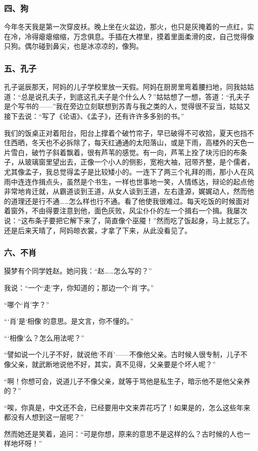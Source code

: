 \subsubsection*{四、狗}
\par 今年冬天我是第一次穿皮袄。晚上坐在火盆边，那火，也只是灰掩着的一点红，实在冷，冷得瘪瘪缩缩，万念俱息。手插在大襟里，摸着里面柔滑的皮，自己觉得像只狗。偶尔碰到鼻尖，也是冰凉凉的，像狗。
\subsubsection*{五、孔子}
\par 孔子诞辰那天，阿妈的儿子学校里放一天假。阿妈在厨房里弯着腰扫地，同我姑姑道：“总是说孔夫子，到底这孔夫子是个什么人？”姑姑想了一想，答道：“孔夫子是个写书的——”我在旁边立刻联想到苏青与我之类的人，觉得很不妥当，姑姑又接下去说：“写了《论语》、《孟子》，还有许许多多别的书。”
\par 我们的饭桌正对着阳台，阳台上撑着个破竹帘子，早已破得不可收拾，夏天也挡不住西晒，冬天也不必拆除了，每天红通通的太阳落山，或是下雨，高楼外的天色一片雪白，破竹子斜着飘着，很有芦苇的感觉。有一向，芦苇上拴了块污旧的布条子，从玻璃窗里望出去，正像一个小人的侧影，宽袍大袖，冠带齐整，是个儒者，尤其像孟子，我总觉得孟子是比较矮小的。一连下了两三个礼拜的雨，那小人在风雨中连连作揖点头，虽然是个书生，一样也世事地一笑，人情练达，辩论的起点他非常地肯迁就，从霸道谈到王道，从女人谈到王道，左右逢源，娓娓动人，然而他的道理还是行不通……怎么样也行不通。看了他使我很难过。每天吃饭的时候面对着窗外，不由得要注意到他，面色灰败，风尘仆仆的左一个揖右一个揖。我屡次说：“这布条子要把它解下来了，简直像个巫魇！”然而吃了饭起身，马上就忘了。还是后来天晴了，阿妈晾衣裳，才拿了下来，从此没看见了。
\subsubsection*{六、不肖}
\par 獏梦有个同学姓赵。她问我：“赵……怎么写的？”
\par 我说：“一个‘走’字，你知道的；那边一个‘肖’字。”
\par “哪个‘肖’字？”
\par “‘肖’是‘相像’的意思。是文言，你不懂的。”
\par “‘相像’么？怎么用法呢？”
\par “譬如说一个儿子不好，就说他‘不肖’——不像他父亲。古时候人很专制，儿子不像父亲，就武断地说他不好，其实，真不见得，父亲要是个坏人呢？”
\par “啊！你想可会，说道儿子不像父亲，就等于骂他是私生子，暗示他不是他父亲养的？”
\par “唉，你真是，中文还不会，已经要用中文来弄花巧了！如果是的，怎么这些年来都没有人想到这一层呢？”
\par 然而她还是笑着，追问：“可是你想，原来的意思不是这样的么？古时候的人也一样地坏呀！”
